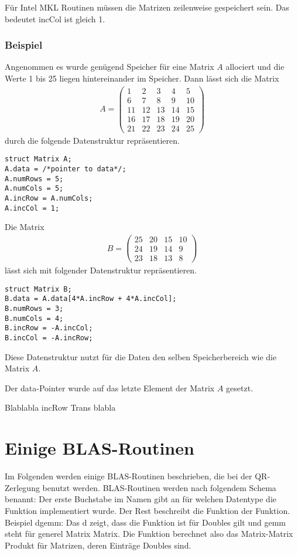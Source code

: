 Für Intel MKL Routinen müssen die Matrizen zeilenweise gespeichert sein.
Das bedeutet incCol ist gleich 1.

\subsubsection{Beispiel}
Angenommen es wurde genügend Speicher für eine Matrix $A$ allociert und die Werte 1 bis 25 liegen hintereinander im Speicher.
Dann lässt sich die Matrix
\begin{align*}
	A = \begin{pmatrix}
	 1 &  2 &  3 &  4 &  5 \\
	 6 &  7 &  8 &  9 & 10 \\
	11 & 12 & 13 & 14 & 15 \\
	16 & 17 & 18 & 19 & 20 \\
	21 & 22 & 23 & 24 & 25 
	\end{pmatrix}
\end{align*}
durch die folgende Datenstruktur repräsentieren.
\begin{lstlisting}
struct Matrix A;
A.data = /*pointer to data*/;
A.numRows = 5; 
A.numCols = 5;
A.incRow = A.numCols;
A.incCol = 1;
\end{lstlisting}
Die Matrix 
\begin{align*}
B = \begin{pmatrix}
25 &  20 &  15 & 10 \\
24 &  19 &  14 & 9 \\
23 &  18 &  13 & 8 
\end{pmatrix}
\end{align*}
lässt sich mit folgender Datenstruktur repräsentieren.
\begin{lstlisting}
struct Matrix B;
B.data = A.data[4*A.incRow + 4*A.incCol];
B.numRows = 3; 
B.numCols = 4;
B.incRow = -A.incCol;
B.incCol = -A.incRow;
\end{lstlisting}
Diese Datenstruktur nutzt für die Daten den selben Speicherbereich wie die Matrix $A$. 

Der data-Pointer wurde auf das letzte Element der Matrix $A$ gesetzt.

Blablabla incRow Trans blabla


\newpage
\section{Einige BLAS-Routinen}
Im Folgenden werden einige BLAS-Routinen beschrieben, die bei der QR-Zerlegung benutzt werden.
BLAS-Routinen werden nach folgendem Schema benannt:
Der erste Buchstabe im Namen gibt an für welchen Datentype die Funktion implementiert wurde. Der Rest beschreibt die Funktion der Funktion.\\
Beispiel \glqq dgemm\grqq{}: Das \glqq d\grqq{} zeigt, dass die Funktion ist für Doubles gilt und  \glqq gemm\grqq{} steht für \glqq generel Matrix Matrix\grqq{}. Die  Funktion berechnet also das Matrix-Matrix Produkt für Matrizen, deren Einträge Doubles sind.

